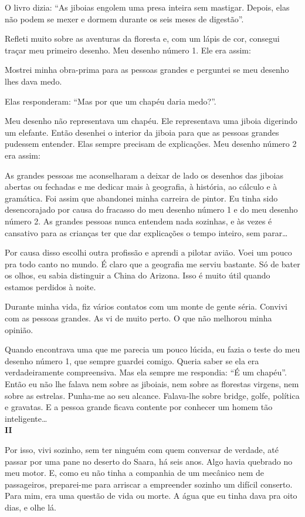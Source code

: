 \begin{Parallel}[p]{}{}
{O livro dizia: ``As jiboias engolem uma presa inteira sem mastigar.
Depois, elas não podem se mexer e dormem durante os seis meses de
digestão''.

Refleti muito sobre as aventuras da floresta e, com um lápis de cor,
consegui traçar meu primeiro desenho. Meu desenho número 1. Ele era
assim:

Mostrei minha obra-prima para as pessoas grandes e perguntei se meu
desenho lhes dava medo.

Elas responderam: ``Mas por que um chapéu daria medo?''.

Meu desenho não representava um chapéu. Ele representava uma jiboia
digerindo um elefante. Então desenhei o interior da jiboia para que as
pessoas grandes pudessem entender. Elas sempre precisam de explicações.
Meu desenho número 2 era assim:

As grandes pessoas me aconselharam a deixar de lado os desenhos das
jiboias abertas ou fechadas e me dedicar mais à geografia, à história,
ao cálculo e à gramática. Foi assim que abandonei minha carreira de
pintor. Eu tinha sido desencorajado por causa do fracasso do meu desenho
número 1 e do meu desenho número 2. As grandes pessoas nunca entendem
nada sozinhas, e às vezes é cansativo para as crianças ter que dar
explicações o tempo inteiro, sem parar\ldots{}

Por causa disso escolhi outra profissão e aprendi a pilotar avião. Voei
um pouco pra todo canto no mundo. É claro que a geografia me serviu
bastante. Só de bater os olhos, eu sabia distinguir a China do Arizona.
Isso é muito útil quando estamos perdidos à noite.

Durante minha vida, fiz vários contatos com um monte de gente séria.
Convivi com as pessoas grandes. As vi de muito perto. O que não melhorou
minha opinião.

Quando encontrava uma que me parecia um pouco lúcida, eu fazia o teste
do meu desenho número 1, que sempre guardei comigo. Queria saber se ela
era verdadeiramente compreensiva. Mas ela sempre me respondia: ``É um
chapéu''. Então eu não lhe falava nem sobre as jiboiais, nem sobre as
florestas virgens, nem sobre as estrelas. Punha-me ao seu alcance.
Falava-lhe sobre bridge, golfe, política e gravatas. E a pessoa grande
ficava contente por conhecer um homem tão inteligente\ldots{}\\

\textbf{II}

Por isso, vivi sozinho, sem ter ninguém com quem conversar de verdade,
até passar por uma pane no deserto do Saara, há seis anos. Algo havia
quebrado no meu motor. E, como eu não tinha a companhia de um mecânico
nem de passageiros, preparei-me para arriscar a empreender sozinho um
difícil conserto. Para mim, era uma questão de vida ou morte. A água que
eu tinha dava pra oito dias, e olhe lá.

}
\end{Parallel}
